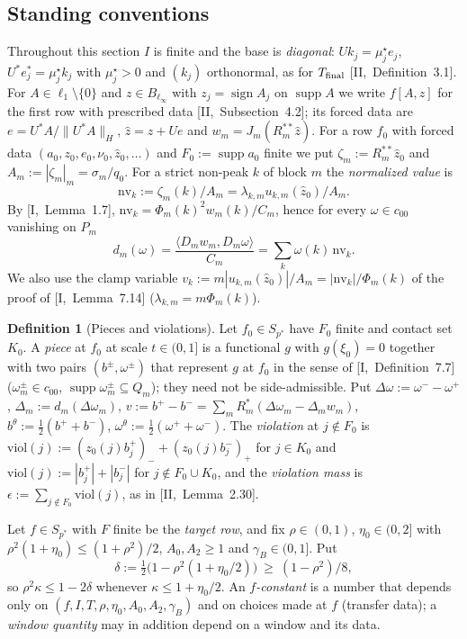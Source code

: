 \documentclass[10pt]{amsart}
\theoremstyle{definition}
\newtheorem{definition}[theorem]{Definition}
\theoremstyle{remark}
\newcommand{\supp}{\operatorname{supp}}
\newcommand{\sgn}{\operatorname{sign}}
\newcommand{\zh}{\hat z}
\newcommand{\ip}[2]{\langle #1,#2\rangle}
\begin{document}
\subsection*{Standing conventions}
Throughout this section $I$ is finite and the base is \emph{diagonal}:
$Uk_j=\mu^\star_je_j$, $U^*e^*_j=\mu^\star_jk_j$ with $\mu^\star_j>0$ and
$(k_j)$ orthonormal, as for $T_{\rm final}$ [II,~Definition~3.1].  For
$A\in\ell_1\setminus\{0\}$ and $z\in B_{\ell_\infty}$ with $z_j=\sgn A_j$ on
$\supp A$ we write $f[A,z]$ for the first row with prescribed data
[II,~Subsection~4.2]; its forced data are $e=U^*A/\|U^*A\|_H$, $\zh=z+Ue$ and
$w_m=J_m(R_m^{**}\zh)$.  For a row $f_0$ with forced data
$(a_0,z_0,e_0,\nu_0,\zh_0,\dots)$ and $F_0:=\supp a_0$ finite we put
$\zeta_m:=R_m^{**}\zh_0$ and $A_m:=|\zeta_m|_m=\sigma_m/q_0$.  For a strict
non-peak $k$ of block $m$ the \emph{normalized value} is
\[
 \mathrm{nv}_k:=\zeta_m(k)/A_m=\lambda_{k,m}u_{k,m}(\zh_0)/A_m .
\]
By [I,~Lemma~1.7], $\mathrm{nv}_k=\Phi_m(k)^2w_m(k)/C_m$, hence for every
$\omega\in c_{00}$ vanishing on $P_m$
\begin{equation}\label{eq:III-nv}
 d_m(\omega)=\frac{\ip{D_mw_m}{D_m\omega}}{C_m}=\sum_k\omega(k)\,\mathrm{nv}_k .
\end{equation}
We also use the clamp variable $v_k:=m|u_{k,m}(\zh_0)|/A_m=|\mathrm{nv}_k|/
\Phi_m(k)$ of the proof of [I,~Lemma~7.14] ($\lambda_{k,m}=m\Phi_m(k)$).

\begin{definition}[Pieces and violations]\label{def:III-pieces}
Let $f_0\in S_{p^*}$ have $F_0$ finite and contact set $K_0$.  A \emph{piece}
at $f_0$ at scale $t\in(0,1]$ is a functional $g$ with $g(\xi_0)=0$ together
with two pairs $(b^\pm,\omega^\pm)$ that represent $g$ at $f_0$ in the sense of
[I,~Definition~7.7] \textup{(}$\omega^\pm_m\in c_{00}$,
$\supp\omega^\pm_m\subseteq Q_m$\textup{)}; they need not be side-admissible.
Put $\Delta\omega:=\omega^--\omega^+$, $\Delta_m:=d_m(\Delta\omega_m)$,
$v:=b^+-b^-=\sum_mR_m^*(\Delta\omega_m-\Delta_mw_m)$,
$b^\theta:=\frac12(b^++b^-)$, $\omega^\theta:=\frac12(\omega^++\omega^-)$.  The
\emph{violation} at $j\notin F_0$ is $\mathrm{viol}(j):=(z_0(j)b^+_j)_-+
(z_0(j)b^-_j)_+$ for $j\in K_0$ and $\mathrm{viol}(j):=|b^+_j|+|b^-_j|$ for
$j\notin F_0\cup K_0$, and the \emph{violation mass} is
$\epsilon:=\sum_{j\notin F_0}\mathrm{viol}(j)$, as in [II,~Lemma~2.30].
\end{definition}

Let $f\in S_{p^*}$ with $F$ finite be the \emph{target row}, and fix
$\rho\in(0,1)$, $\eta_0\in(0,2]$ with $\rho^2(1+\eta_0)\le(1+\rho^2)/2$,
$A_0,A_2\ge1$ and $\gamma_B\in(0,1]$.  Put
\[
 \delta:=\tfrac12\big(1-\rho^2(1+\eta_0/2)\big)\ \ge\ (1-\rho^2)/8 ,
\]
so $\rho^2\kappa\le1-2\delta$ whenever $\kappa\le1+\eta_0/2$.  An
\emph{$f$-constant} is a number that depends only on $(f,I,T,\rho,\eta_0,
A_0,A_2,\gamma_B)$ and on choices made at $f$ (transfer data); a
\emph{window quantity} may in addition depend on a window and its data.
\end{document}
